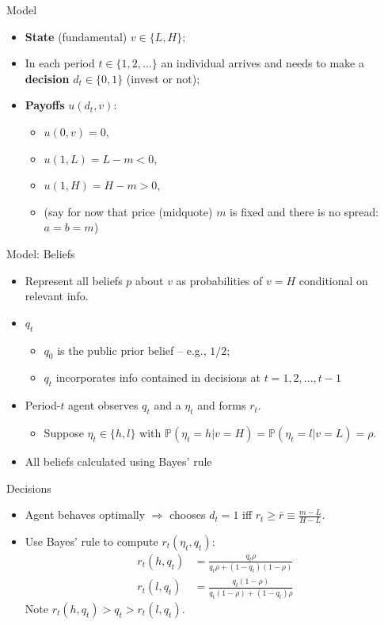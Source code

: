 \documentclass[english,10pt
,aspectratio=169
]{beamer}
\begin{document}
\begin{frame}{Model}
	\begin{itemize}
		\item \textbf{State} (fundamental) $v \in \{L,H\}$;
		\item In each period $t \in \{1,2, ...\}$ an individual arrives and needs to make a \textbf{decision} $d_t \in \{0,1\}$ (invest or not);
		\item \textbf{Payoffs} $u(d_t,v)$:
		\begin{itemize}
			\item $u(0,v) = 0$,
			\item $u(1,L) = L-m < 0$,
			\item $u(1,H) = H-m > 0$,
			\item (say for now that price (midquote) $m$ is fixed and there is no spread: $a=b=m$)
		\end{itemize}
	\end{itemize}
\end{frame}


\begin{frame}{Model: Beliefs}
	\begin{itemize}
		\item Represent all beliefs $p$ about $v$ as probabilities of $v=H$ conditional on relevant info.
		\item {} $q_t$
		\begin{itemize}
			\item $q_0$ is the public prior belief -- e.g., $1/2$;
			\item $q_t$ incorporates info contained in decisions at $t = 1,2,...,t-1$
		\end{itemize}
		\item Period-$t$ agent observes $q_t$ and a  $\eta_t$ and forms  $r_t$.
		\begin{itemize}
			\item Suppose $\eta_t \in \{h,l\}$ with $\mathbb{P}(\eta_t=h | v=H) = \mathbb{P}(\eta_t=l | v=L) = \rho$.
		\end{itemize}
		\item All beliefs calculated using Bayes' rule
	\end{itemize}
\end{frame}


\begin{frame}{Decisions}
	\begin{itemize}
		\item Agent behaves optimally $\Rightarrow$ chooses $d_t=1$ iff $r_t \geq \bar{r} \equiv \frac{m-L}{H-L}$.
		\item Use Bayes' rule to compute $r_t(\eta_t,q_t)$:
		\begin{align*}
			r_t(h,q_t) &= \frac{q_t \rho}{q_t \rho + (1-q_t) (1-\rho)}
			\\
			r_t(l,q_t) &= \frac{q_t (1-\rho)}{q_t (1-\rho) + (1-q_t) \rho}
		\end{align*}
		Note $r_t(h,q_t) > q_t > r_t(l,q_t)$.
	\end{itemize}
\end{frame}
\end{document}
